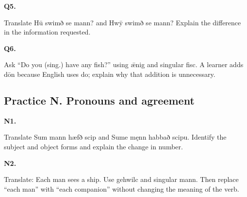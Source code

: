 \par\begin{minipage}{\linewidth}\raggedright
\textbf{Q5.}

Translate Hū swimð se mann? and Hwȳ swimð se mann? Explain the difference in the information requested.

\end{minipage}\par\addvspace{4pt}

\par\begin{minipage}{\linewidth}\raggedright
\textbf{Q6.}

Ask “Do you (sing.) have any fish?” using ǣnig and singular fisc. A learner adds dōn because English uses do; explain why that addition is unnecessary.

\end{minipage}\par\addvspace{4pt}

\subsection*{Practice N. Pronouns and agreement}

\par\begin{minipage}{\linewidth}\raggedright
\textbf{N1.}

Translate Sum mann hæfð scip and Sume męnn habbað scipu. Identify the subject and object forms and explain the change in number.

\end{minipage}\par\addvspace{4pt}

\par\begin{minipage}{\linewidth}\raggedright
\textbf{N2.}

Translate: Each man sees a ship. Use gehwilc and singular mann. Then replace “each man” with “each companion” without changing the meaning of the verb.

\end{minipage}\par\addvspace{4pt}

